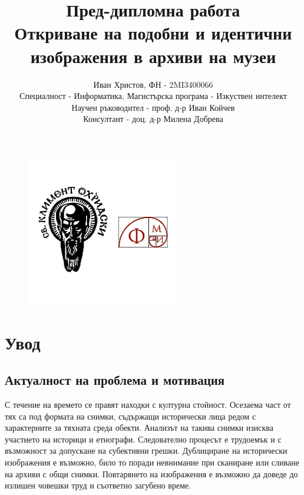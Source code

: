 \documentclass[a4paper,12pt]{article}
\begin{document}
\title{
    Пред-дипломна работа\\
    \large Откриване на подобни и идентични изображения в архиви на музеи}
    \author{
        Иван Христов, ФН - 2MI3400066\\
        Специалност - Информатика, Магистърска програма - Изкуствен интелект\\
        Научен ръководител - проф. д-р Иван Койчев\\
        Консултант - доц. д-р Милена Добрева
    }

\maketitle

\begin{figure}[h]
    \centering
    \includegraphics[width=250px]{fmi.png}
    \label{fig:fmi}
\end{figure}

\pagebreak

\tableofcontents
\pagebreak

\section{Увод}

\subsection{Актуалност на проблема и мотивация}

С течение на времето се правят находки с културна стойност. Осезаема част от тях са под формата на снимки, съдържащи исторически лица редом с характерните за тяхната среда обекти. Анализът на такива снимки изисква участието на историци и етнографи. Следователно процесът е трудоемък и с възможност за допускане на субективни грешки. Дублициране на исторически изображения е възможно, било то поради невнимание при сканиране или сливане на архиви с общи снимки. Повтарянето на изображения е възможно да доведе до излишен човешки труд и съответно загубено време.
\end{document}
